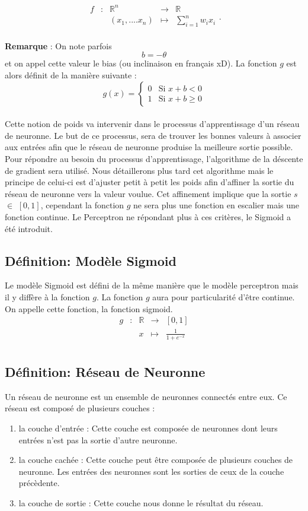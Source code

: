\documentclass{article}
\newcommand{\fonction}[5]{
	\begin{array}{ccccc}
#1 & : & #2 & \to & #3\\
	& & #4 & \mapsto & #5\\ 
	\end{array}
}
\begin{document}
		\[\fonction{f}{\mathbb{R}^n}{\mathbb{R}}{(x_1,....x_n)}{\sum_{i=1}^{n} {w_ix_i}}. \]

	
	\textbf{Remarque} : On note parfois \[b = -\theta \]  et on appel cette valeur le bias (ou inclinaison en français xD). La fonction $g$ est alors définit de la manière suivante :   
		\[g(x) = \begin{cases} 0 &\mbox{Si } x + b < 0 \\
				 1 & \mbox{Si } x + b \geq 0
	 		 \end{cases} \] \\ 

	 
Cette notion de poids va intervenir dans le processus d'apprentissage d'un réseau de neuronne. Le but de ce processus, sera de trouver les bonnes valeurs à associer aux entrées afin que le réseau de neuronne produise la meilleure sortie possible. Pour répondre au besoin du processus d'apprentissage, l'algorithme de la déscente de gradient sera utilisé. Nous détaillerons plus tard cet algorithme mais le principe de celui-ci est d'ajuster petit à petit les poids afin d'affiner la sortie du réseau de neuronne vers la valeur voulue. Cet affinement implique que la sortie $s$ $\in$ $\left[0,1\right]$, cependant la fonction $g$ ne sera  plus une fonction en escalier mais une fonction continue. Le Perceptron ne répondant plus à ces critères, le Sigmoid a été introduit. \\

	\subsection{Définition: Modèle Sigmoid}
	 Le modèle Sigmoid est défini de la même manière que le modèle perceptron mais il y diffère à la fonction $g$. La fonction $g$ aura pour particularité d'être continue. On appelle cette fonction, la fonction sigmoid.  
		  \[ \fonction{g}{\mathbb{R}}{\left[0,1\right]}{x}{ \frac{1}{1+ e^{-x}}} \]
		
	\subsection{Définition: Réseau de Neuronne}
 	Un réseau de neuronne est un ensemble de neuronnes connectés entre eux. Ce réseau est composé de plusieurs couches : 
	\begin{enumerate}	
		\item la couche d'entrée : Cette couche est composée de neuronnes dont leurs entrées n'est pas la sortie d'autre neuronne. 
		\item la couche cachée : Cette couche peut être composée de plusieurs couches de neuronne. Les entrées des neuronnes sont les sorties de ceux de la couche précèdente.
		\item la couche de sortie : Cette couche nous donne le résultat du réseau.
	\end{enumerate}		
\end{document}
